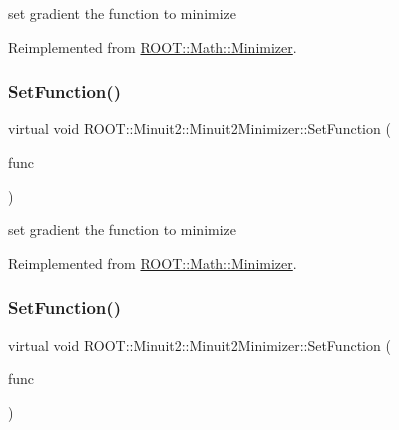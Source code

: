 set gradient the function to minimize 



Reimplemented from \mbox{\hyperlink{classROOT_1_1Math_1_1Minimizer_a1d9ff15aa732e518a60a05dcbd82c34a}{R\+O\+O\+T\+::\+Math\+::\+Minimizer}}.

\mbox{\label{classROOT_1_1Minuit2_1_1Minuit2Minimizer_aeb98c40cf3486fe8fb9bec4da0f7942e}} 
\subsubsection{\texorpdfstring{SetFunction()}{SetFunction()}\hspace{0.1cm}{\footnotesize\ttfamily [5/6]}}
{\footnotesize\ttfamily virtual void R\+O\+O\+T\+::\+Minuit2\+::\+Minuit2\+Minimizer\+::\+Set\+Function (\begin{DoxyParamCaption}\item[{const \mbox{\hyperlink{namespaceROOT_1_1Math_a014e019aaf9304a00e9231bd9ed232fb}{R\+O\+O\+T\+::\+Math\+::\+I\+Multi\+Grad\+Function}} \&}]{func }\end{DoxyParamCaption})\hspace{0.3cm}{\ttfamily [virtual]}}



set gradient the function to minimize 



Reimplemented from \mbox{\hyperlink{classROOT_1_1Math_1_1Minimizer_a1d9ff15aa732e518a60a05dcbd82c34a}{R\+O\+O\+T\+::\+Math\+::\+Minimizer}}.

\mbox{\label{classROOT_1_1Minuit2_1_1Minuit2Minimizer_aeb98c40cf3486fe8fb9bec4da0f7942e}} 
\subsubsection{\texorpdfstring{SetFunction()}{SetFunction()}\hspace{0.1cm}{\footnotesize\ttfamily [6/6]}}
{\footnotesize\ttfamily virtual void R\+O\+O\+T\+::\+Minuit2\+::\+Minuit2\+Minimizer\+::\+Set\+Function (\begin{DoxyParamCaption}\item[{const \mbox{\hyperlink{namespaceROOT_1_1Math_a014e019aaf9304a00e9231bd9ed232fb}{R\+O\+O\+T\+::\+Math\+::\+I\+Multi\+Grad\+Function}} \&}]{func }\end{DoxyParamCaption})\hspace{0.3cm}{\ttfamily [virtual]}}



